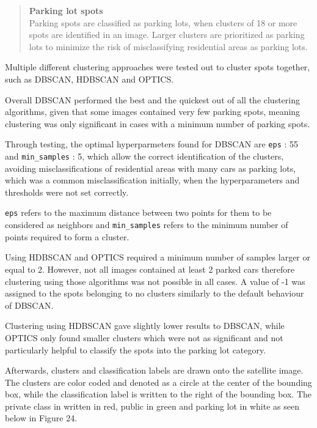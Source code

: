 \vspace{0.5cm}

\begin{quote}
  \textbf{Parking lot spots} \\
  Parking spots are classified as parking lots, when clusters of 18 or
  more spots are identified in an image. Larger clusters are prioritized as
  parking lots to minimize the risk of misclassifying residential areas as parking
  lots.
\end{quote}

\vspace{0.5cm}

Multiple different clustering approaches were tested out to cluster spots
together, such as DBSCAN, HDBSCAN and OPTICS.

Overall DBSCAN performed the best and the quickest out of all the clustering
algorithms, given that some images contained very few parking spots, meaning
clustering was only significant in cases with a minimum number of parking spots.

Through testing, the optimal hyperparmeters found for DBSCAN are \texttt{eps} :
55 and \texttt{min\_samples} : 5, which allow the correct identification of the
clusters, avoiding misclassifications of residential areas with many cars as
parking lots, which was a common misclassification initially, when the
hyperparameters and thresholds were not set correctly.

\texttt{eps} refers to the maximum distance between two points for them to be
considered as neighbors and \texttt{min\_samples} refers to the minimum number
of points required to form a cluster.

Using HDBSCAN and OPTICS required a minimum number of samples larger or equal to
2. However, not all images contained at least 2 parked cars therefore clustering using
those algorithms was not possible in all cases. A value of -1 was assigned to the
spots belonging to no clusters similarly to the default behaviour of DBSCAN.

Clustering using HDBSCAN gave slightly lower results to DBSCAN, while OPTICS
only found smaller clusters which were not as significant and not particularly
helpful to classify the spots into the parking lot category.

Afterwards, clusters and classification labels are drawn onto the satellite
image. The clusters are color coded and denoted as a circle at the center of the
bounding box, while the classification label is written to the right of the
bounding box. The private class in written in red, public in green and parking
lot in white as seen below in Figure 24.

